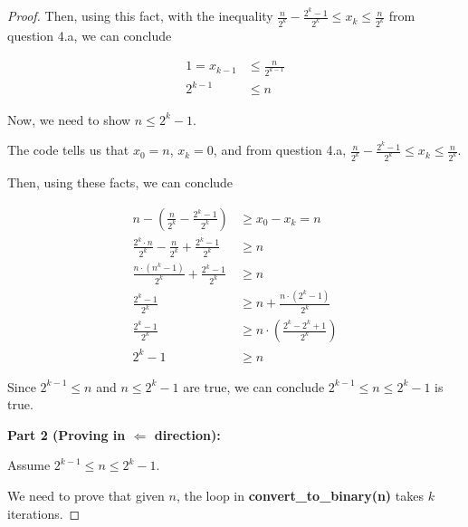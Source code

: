\documentclass[12pt]{article}
\begin{document}
\begin{enumerate}[a.]
\begin{proof}
        \bigskip

        Then, using this fact, with the inequality $\frac{n}{2^k} - \frac{2^k - 1}{2^k} \leq x_k \leq \frac{n}{2^k}$
        from question 4.a, we can conclude

        \bigskip

        \setcounter{equation}{0}
        \begin{align}
            1 = x_{k-1} &\leq \frac{n}{2^{k-1}}\\
            2^{k-1} &\leq n
        \end{align}

        \bigskip

        Now, we need to show $n \leq 2^k - 1$.

        \bigskip

        The code tells us that $x_0 = n$, $x_k = 0$, and from question 4.a,
        $\frac{n}{2^k} - \frac{2^k - 1}{2^k} \leq x_k \leq \frac{n}{2^k}$.

        \bigskip

        Then, using these facts, we can conclude

        \begin{align}
            n - \left( \frac{n}{2^k} - \frac{2^k - 1}{2^k} \right) &\geq x_0 - x_k = n\\
            \frac{2^k \cdot n}{2^k} - \frac{n}{2^k} + \frac{2^k -1}{2^k} &\geq n\\
            \frac{n \cdot (n^k - 1)}{2^k} + \frac{2^k -1}{2^k} &\geq n\\
            \frac{2^k -1}{2^k} &\geq n + \frac{n \cdot (2^k - 1)}{2^k}\\
            \frac{2^k -1}{2^k} &\geq n \cdot \left(\frac{2^k - 2^k + 1}{2^k} \right)\\
            2^k - 1 &\geq n
        \end{align}

        \bigskip

        Since $2^{k-1} \leq n$ and $n \leq 2^k-1$ are true, we can conclude
        $2^{k-1} \leq n \leq 2^k-1$ is true.

        \bigskip

        \textbf{Part 2 (Proving in $\Leftarrow$ direction):}

        \bigskip

        Assume $2^{k-1} \leq n \leq 2^k - 1$.

        \bigskip

        We need to prove that given $n$, the loop in \textbf{convert\_to\_binary(n)}
        takes $k$ iterations.


\end{proof}
\end{enumerate}
\end{document}
